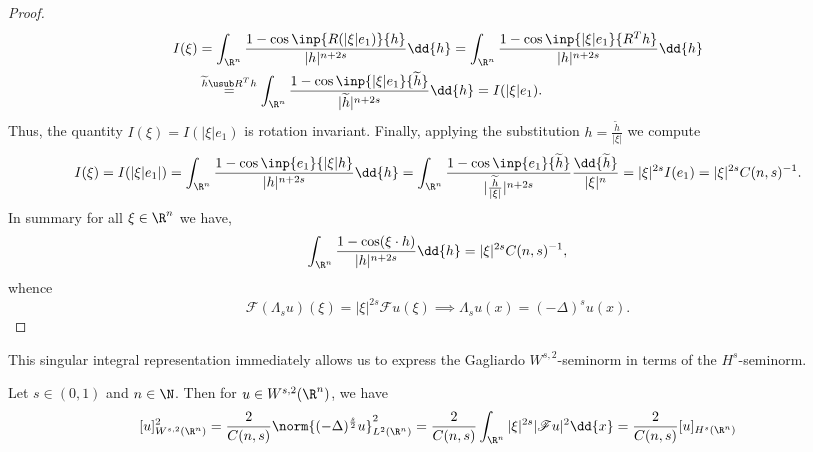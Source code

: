 \documentclass[../main.tex]{subfiles}
\begin{document}
\begin{proof}
    \begin{align*}
        I(\xi) &= \int_{\R^{n}} \frac{1-\cos\inp{R(|\xi| e_{1})}{h}}{|h|^{n+2s}} \dd{h} = \int_{\R^{n}} \frac{1-\cos\inp{| \xi|e_{1}}{R^{T}h}}{|h|^{n+2s}}\dd{h} \\& \overset{\widetilde{h}\usub R^{T}h}{=} \int_{\R^{n}} \frac{1-\cos\inp{| \xi|e_{1}}{\widetilde{h}}}{|\widetilde{h}|^{n+2s}}\dd{h} = I(| \xi|e_{1}).
    \end{align*}
    Thus, the quantity $ I(\xi) = I(| \xi|e_{1}) $ is rotation invariant. Finally, applying the substitution $ h = \frac{\widetilde{h}}{| \xi|} $ we compute
    \[
        I(\xi) = I(| \xi|e_{1}|) =  \int_{\R^{n}} \frac{1-\cos\inp{e_{1}}{| \xi|h}}{|h|^{n+2s}}\dd{h} = \int_{\R^{n}} \frac{1-\cos\inp{e_{1}}{\widetilde{h}}}{|\frac{\widetilde{h}}{| \xi|}|^{n+2s}}\frac{\dd{\widetilde{h}}}{| \xi|^{n}} = | \xi|^{2s}I(e_{1}) = | \xi|^{2s} C(n,s)^{-1}.
    \]
    In summary for all $ \xi\in \R^{n} $ we have,
    \begin{equation}\label{lapconstant}
        \int_{\R^{n}}\frac{1-\cos( \xi \cdot h)}{|h|^{n+2s}} \dd{h} = | \xi|^{2s} C(n,s)^{-1},
    \end{equation}
    whence 
    \[
        \mathscr{F}(\Lambda_{s}u)(\xi) = | \xi|^{2s}\mathscr{F}u(\xi) \implies \Lambda_{s}u(x) = (-\Delta )^{s}u(x).
    \]


\end{proof}


This singular integral representation immediately allows us to express the Gagliardo $ W^{s,2} $-seminorm in terms of the $ H^{s} $-seminorm.

\begin{proposition}\label{fracnormislaplacian}
    Let $ s\in (0,1) $ and $ n\in \N $. Then for $ u\in W^{s,2}(\R^{n}) $, we have 
    \begin{equation}\label{gagnormisbessel}
        [u]_{W^{s,2}(\R^{n})}^{2} = \frac{2}{C(n,s)} \norm{(-\Delta )^{\frac{s}{2}}u}_{L^{2}(\R^{n})}^{2} = \frac{2}{C(n,s)} \int_{\R^{n}} | \xi|^{2s} |\mathscr{F}u|^{2} \dd{x} = \frac{2}{C(n,s)}[u]_{H^{s}(\R^{n})}
    \end{equation}
\end{proposition}
\end{document}
